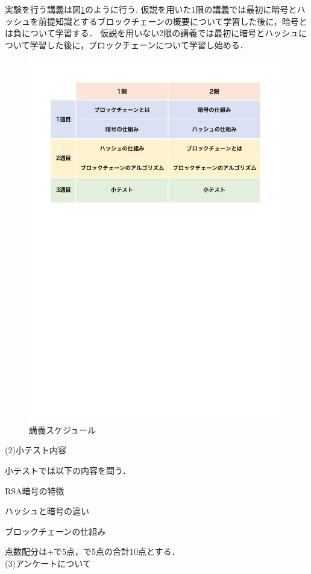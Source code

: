 \documentclass[a4j,12pt]{jsarticle}
\begin{document}
実験を行う講義は図\ref{fig:timeline}のように行う.
仮説を用いた1限の講義では最初に暗号とハッシュを前提知識とするブロックチェーンの概要について学習した後に，暗号とは負について学習する．
仮説を用いない2限の講義では最初に暗号とハッシュについて学習した後に，ブロックチェーンについて学習し始める．
\begin{figure}[H]
\centering
\includegraphics[mediaboxonly=/CropBox,width=12cm]{timeline.pdf}
\caption{講義スケジュール}
\label{fig:timeline}
\end{figure} 


(2)小テスト内容

小テストでは以下の内容を問う．

RSA暗号の特徴

ハッシュと暗号の違い

ブロックチェーンの仕組み

点数配分は+で5点，で5点の合計10点とする．\\


(3)アンケートについて
\end{document}

